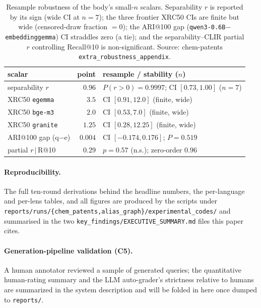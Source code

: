 \documentclass[11pt]{article}
\begin{document}
\begin{table}[t]
  \centering
  \small
  \begin{tabular}{lrl}
    \toprule
    scalar & point & resample / stability ($n$) \\
    \midrule
    separability $r$ & $0.96$ & $P(r{>}0){=}0.9997$; CI $[0.73,1.00]$ ($n{=}7$) \\
    XRC50 \texttt{egemma} & $3.5$ & CI $[0.91,12.0]$ (finite, wide) \\
    XRC50 \texttt{bge-m3} & $2.0$ & CI $[0.53,7.0]$ (finite, wide) \\
    XRC50 \texttt{granite} & $1.25$ & CI $[0.28,12.25]$ (finite, wide) \\
    ARI@100 gap (q$-$e) & $0.004$ & CI $[-0.174,0.176]$; $P{=}0.519$ \\
    partial $r\,|\,$R@10 & $0.29$ & $p{=}0.57$ (n.s.); zero-order $0.96$ \\
    \bottomrule
  \end{tabular}
  \caption{Resample robustness of the body's small-$n$ scalars. Separability $r$
  is reported by its sign (wide CI at $n{=}7$); the three frontier XRC50 CIs are
  finite but wide (censored-draw fraction $=0$); the ARI@100 gap
  (\texttt{qwen3-0.6B}$-$\texttt{embeddinggemma}) CI straddles zero (a tie); and
  the separability--CLIR partial $r$ controlling Recall@10 is non-significant.
  Source: chem-patents \texttt{extra\_robustness\_appendix}.}
  \label{tab:robust}
\end{table}

\paragraph{Reproducibility.}
The full ten-round derivations behind the headline numbers, the per-language and
per-lens tables, and all figures are produced by the scripts under
\texttt{reports/runs/\{chem\_patents,alias\_graph\}/experimental\_codes/} and
summarised in the two \texttt{key\_findings/EXECUTIVE\_SUMMARY.md} files this
paper cites.

\paragraph{Generation-pipeline validation (C5).}
A human annotator reviewed a sample of generated queries; the quantitative
human-rating summary and the LLM auto-grader's strictness relative to humans are
summarized in the system description and will be folded in here once dumped to
\texttt{reports/}.
\end{document}

